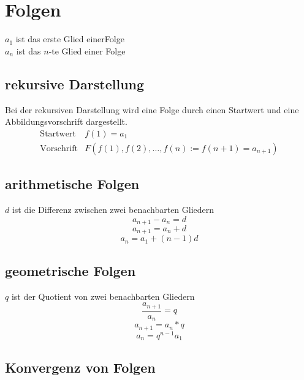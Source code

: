 \section{Folgen}
$a_1$ ist das erste Glied einerFolge\\
$a_n$ ist das $n$-te Glied einer Folge

\subsection{rekursive Darstellung}
Bei der rekursiven Darstellung wird eine Folge durch einen Startwert und eine Abbildungsvorschrift dargestellt. \\
\[ \boxed{ \begin{matrix}
\text{Startwert} & f(1) = a_1 \\
\text{Vorschrift} & F(f(1), f(2), \ldots, f(n) := f(n + 1) = a_{n + 1})
\end{matrix}} \]

\subsection{arithmetische Folgen}
$d$ ist die Differenz zwischen zwei benachbarten Gliedern\\
\[ \boxed{a_{n+1} - a_n = d} \]
\[ \boxed{a_{n+1} = a_n + d} \]
\[ \boxed{a_n = a_1 + (n - 1)d} \]

\subsection{geometrische Folgen}
$q$ ist der Quotient von zwei benachbarten Gliedern\\
\[ \boxed{\frac{a_{n+1}}{a_n} = q} \]
\[ \boxed{a_{n+1} = a_n * q} \]
\[ \boxed{a_n = q^{n-1} a_1} \]

\subsection{Konvergenz von Folgen}
